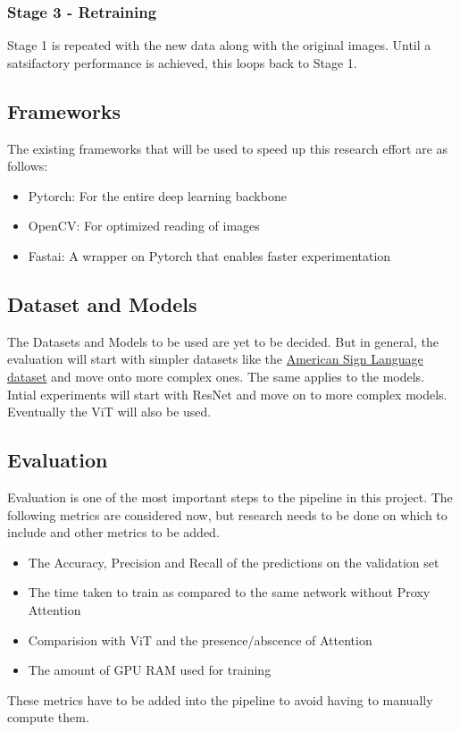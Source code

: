 \subsubsection*{Stage 3 - Retraining}
Stage 1 is repeated with the new data along with the original images. Until a satsifactory performance is achieved, this loops back to Stage 1.

\subsection{Frameworks}
The existing frameworks that will be used to speed up this research effort are as follows: 
\begin{itemize}
\item Pytorch\cite{paszke2019pytorch}: For the entire deep learning backbone
\item OpenCV\cite{bradski2000opencv}: For optimized reading of images
\item Fastai\cite{howard2018fastai}: A wrapper on Pytorch that enables faster experimentation 
\end{itemize}

\subsection{Dataset and Models}
The Datasets and Models to be used are yet to be decided. But in general, the evaluation will start with simpler datasets like the \href{https://www.kaggle.com/datasets/grassknoted/asl-alphabet}{American Sign Language dataset} and move onto more complex ones.
The same applies to the models. Intial experiments will start with ResNet \cite{he2016deep} and move on to more complex models. Eventually the ViT \cite{dosovitskiy2020image} will also be used.

\subsection{Evaluation}
Evaluation is one of the most important steps to the pipeline in this project. The following metrics are considered now, but research needs to be done on which to include and other metrics to be added.
\begin{itemize}
    \item The Accuracy, Precision and Recall of the predictions on the validation set
    \item The time taken to train as compared to the same network without Proxy Attention
    \item Comparision with ViT \cite{dosovitskiy2020image} and the presence/abscence of Attention
    \item The amount of GPU RAM used for training
\end{itemize}
These metrics have to be added into the pipeline to avoid having to manually compute them.

